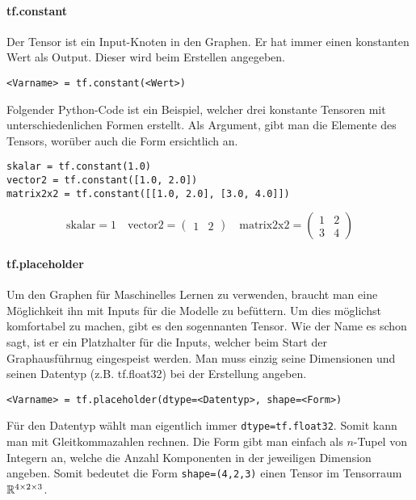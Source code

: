\paragraph{tf.constant}
Der  Tensor ist ein Input-Knoten in den Graphen.
Er hat immer einen konstanten Wert als Output. Dieser wird beim Erstellen
angegeben.
\begin{verbatim}
<Varname> = tf.constant(<Wert>)
\end{verbatim}
\para{}
Folgender Python-Code ist ein Beispiel, welcher drei konstante Tensoren mit unterschiedenlichen
Formen erstellt. Als Argument, gibt man die Elemente des Tensors, worüber auch
die Form ersichtlich an.
\begin{verbatim}
skalar = tf.constant(1.0)
vector2 = tf.constant([1.0, 2.0])
matrix2x2 = tf.constant([[1.0, 2.0], [3.0, 4.0]])
\end{verbatim}
\[\text{skalar}=1 \quad \text{vector2}=\begin{pmatrix}1&2\end{pmatrix} \quad
  \text{matrix2x2}=\begin{pmatrix}1&2\\3&4\end{pmatrix}\]

\paragraph{tf.placeholder}
Um den Graphen für Maschinelles Lernen zu verwenden, braucht man eine
Möglichkeit ihn mit Inputs für die Modelle zu befüttern. Um dies möglichst
komfortabel zu machen, gibt es den sogennanten
 Tensor. Wie der Name es schon sagt, ist er ein
Platzhalter für die Inputs, welcher beim Start der Graphausführnug eingespeist
werden. Man muss einzig seine Dimensionen und seinen Datentyp (z.B. tf.float32) bei der Erstellung angeben.
\para{}
\begin{verbatim}
<Varname> = tf.placeholder(dtype=<Datentyp>, shape=<Form>)
\end{verbatim}
Für den Datentyp wählt man eigentlich immer
\texttt{dtype=tf.float32}. Somit kann man mit Gleitkommazahlen rechnen.
Die Form gibt man einfach als $n$-Tupel von Integern an, welche die Anzahl
Komponenten in der jeweiligen Dimension angeben. Somit bedeutet die Form
\texttt{shape=(4,2,3)} einen Tensor im Tensorraum $\mathbb{R}^{4 \times
  2 \times 3}$.

